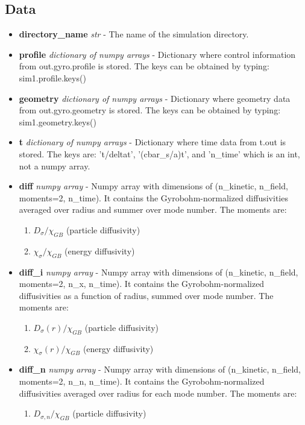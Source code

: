 \documentclass{article}
\begin{document}
\subsection{Data}
\begin{itemize}
\item \textbf{directory\_name}\emph{ str} - The name of the simulation directory.
\item \textbf{profile}\emph{ dictionary of numpy arrays} - Dictionary where control information from out.gyro.profile is stored.  The keys can be obtained by typing: sim1.profile.keys()
\item \textbf{geometry}\emph{ dictionary of numpy arrays} - Dictionary where geometry data from out.gyro.geometry is stored.  The keys can be obtained by typing: sim1.geometry.keys()
\item \textbf{t}\emph{ dictionary of numpy arrays} - Dictionary where time data from t.out is stored.  The keys are: 't/deltat', '(cbar\_s/a)t', and 'n\_time' which is an int, not a numpy array.
\item \textbf{diff}\emph{ numpy array} - Numpy array with dimensions of (n\_kinetic, n\_field, moments=2, n\_time).  It contains the Gyrobohm-normalized diffusivities averaged over radius and summer over mode number.  The moments are:
\begin{enumerate}
\item $D_\sigma/\chi_{GB}$ (particle diffusivity)
\item $\chi_\sigma/\chi_{GB}$ (energy diffusivity)
\end{enumerate}
\item \textbf{diff\_i}\emph{ numpy array} - Numpy array with dimensions of (n\_kinetic, n\_field, moments=2, n\_x, n\_time).  It contains the Gyrobohm-normalized diffusivities as a function of radius, summed over mode number.  The moments are:
\begin{enumerate}
\item $D_\sigma(r)/\chi_{GB}$ (particle diffusivity)
\item $\chi_\sigma(r)/\chi_{GB}$ (energy diffusivity)
\end{enumerate}
\item \textbf{diff\_n}\emph{ numpy array} - Numpy array with dimensions of (n\_kinetic, n\_field, moments=2, n\_n, n\_time).  It contains the Gyrobohm-normalized diffusivities averaged over radius for each mode number.  The moments are:
\begin{enumerate}
\item $D_{\sigma,n}/\chi_{GB}$ (particle diffusivity)

\end{enumerate}
\end{itemize}
\end{document}
